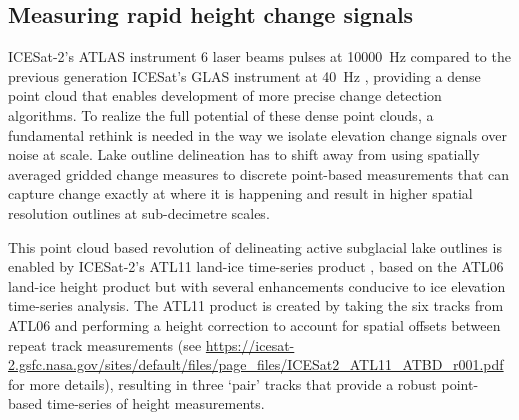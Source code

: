
%


\subsection{Measuring rapid height change signals}

ICESat-2's ATLAS instrument 6 laser beams pulses at \SI{10000}{\hertz} compared to the previous generation ICESat's GLAS instrument at \SI{40}{\hertz} \citep{MarkusIceCloudland2017}, providing a dense point cloud that enables development of more precise change detection algorithms.
To realize the full potential of these dense point clouds, a fundamental rethink is needed in the way we isolate elevation change signals over noise at scale.
Lake outline delineation has to shift away from using spatially averaged gridded change measures \citep[c.f.][]{Smithinventoryactivesubglacial2009} to discrete point-based measurements \citep[c.f.][]{SiegfriedThirteenyearssubglacial2018} that can capture change exactly at where it is happening and result in higher spatial resolution outlines at sub-decimetre scales.

This point cloud based revolution of delineating active subglacial lake outlines is enabled by ICESat-2's ATL11 land-ice time-series product \citep{SmithATLASICESat2L3B2021}, based on the ATL06 land-ice height product \citep{SmithLandiceheightretrieval2019} but with several enhancements conducive to ice elevation time-series analysis.
The ATL11 product \citep{SmithATLASICESat2L3B2021} is created by taking the six tracks from ATL06 and performing a height correction to account for spatial offsets between repeat track measurements (see \url{https://icesat-2.gsfc.nasa.gov/sites/default/files/page_files/ICESat2_ATL11_ATBD_r001.pdf} for more details), resulting in three `pair' tracks that provide a robust point-based time-series of height measurements.


